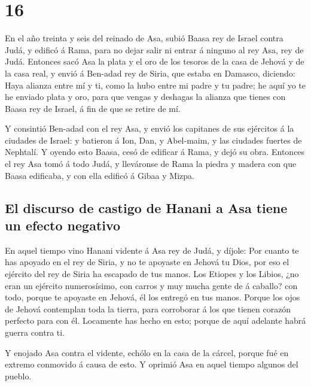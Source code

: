 \hypertarget{section-15}{%
\section{16}\label{section-15}}

 En el año treinta y seis del reinado de Asa, subió Baasa
rey de Israel contra Judá, y edificó á Rama, para no dejar salir ni
entrar á ninguno al rey Asa, rey de Judá.  Entonces sacó Asa
la plata y el oro de los tesoros de la casa de Jehová y de la casa real,
y envió á Ben-adad rey de Siria, que estaba en Damasco, diciendo:
 Haya alianza entre mí y ti, como la hubo entre mi padre y
tu padre; he aquí yo te he enviado plata y oro, para que vengas y
deshagas la alianza que tienes con Baasa rey de Israel, á fin de que se
retire de mí.

 Y consintió Ben-adad con el rey Asa, y envió los capitanes
de sus ejércitos á la ciudades de Israel: y batieron á Ion, Dan, y
Abel-maim, y las ciudades fuertes de Nephtalí.  Y oyendo
esto Baasa, cesó de edificar á Rama, y dejó su obra. 
Entonces el rey Asa tomó á todo Judá, y lleváronse de Rama la piedra y
madera con que Baasa edificaba, y con ella edificó á Gibaa y Mizpa.

\hypertarget{el-discurso-de-castigo-de-hanani-a-asa-tiene-un-efecto-negativo}{%
\subsection{El discurso de castigo de Hanani a Asa tiene un efecto
negativo}\label{el-discurso-de-castigo-de-hanani-a-asa-tiene-un-efecto-negativo}}

 En aquel tiempo vino Hanani vidente á Asa rey de Judá, y
díjole: Por cuanto te has apoyado en el rey de Siria, y no te apoyaste
en Jehová tu Dios, por eso el ejército del rey de Siria ha escapado de
tus manos.  Los Etiopes y los Libios, ¿no eran un ejército
numerosísimo, con carros y muy mucha gente de á caballo? con todo,
porque te apoyaste en Jehová, él los entregó en tus manos. 
Porque los ojos de Jehová contemplan toda la tierra, para corroborar á
los que tienen corazón perfecto para con él. Locamente has hecho en
esto; porque de aquí adelante habrá guerra contra ti.

 Y enojado Asa contra el vidente, echólo en la casa de la
cárcel, porque fué en extremo conmovido á causa de esto. Y oprimió Asa
en aquel tiempo algunos del pueblo.

